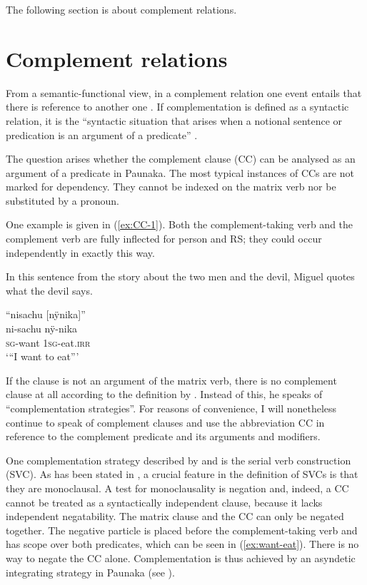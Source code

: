 The following section is about complement relations.



\section{Complement relations}\label{sec:ComplementClauses}

From a semantic-functional view, in a complement relation one event entails that there is reference to another one \citep[95]{Cristofaro2003}. If complementation is defined as a syntactic relation, it is the “syntactic situation that arises when a notional sentence or predication is an argument of a predicate” \citep[52]{Noonan2007}.

The question arises whether the complement clause (CC) can be analysed as an argument  of a predicate in Paunaka. The most typical instances of CCs are not marked for dependency. They cannot be indexed on the matrix verb nor be substituted by a pronoun. 

One example is given in (\ref{ex:CC-1}). Both the complement-taking verb and the complement verb are fully inflected for person and RS; they could occur independently in exactly this way.

In this sentence from the story about the two men and the devil, Miguel quotes what the devil says.

\ea\label{ex:CC-1}
\begingl
\glpreamble “nisachu \textup{[}nÿnika\textup{]}”\\
\gla ni-sachu nÿ-nika\\
\textsc{sg}-want 1\textsc{sg}-eat.\textsc{irr}\\
\glft ‘“I want to eat”’
\endgl
\trailingcitation{[mxx-n101017s-1.035]}
\xe

If the clause is not an argument of the matrix verb, there is no complement clause at all according to the definition by \citet{Dixon2006}. Instead of this, he speaks of “complementation strategies”. For reasons of convenience, I will nonetheless continue to speak of complement clauses and use the abbreviation CC in reference to the complement predicate and its arguments and modifiers.

One complementation strategy described by \citet[34--35]{Dixon2006} and \citet[87--92]{Noonan2007} is the serial verb construction (SVC). As has been stated in , a crucial feature in the definition of SVCs is that they are monoclausal. A test for monoclausality is negation and, indeed, a CC cannot be treated as a syntactically independent clause, because it lacks independent negatability. The matrix clause and the CC can only be negated together. The negative particle is placed before the complement-taking verb and has scope over both predicates, which can be seen in (\ref{ex:want-eat}). There is no way to negate the CC alone. Complementation is thus achieved by an asyndetic integrating strategy in Paunaka (see ).

